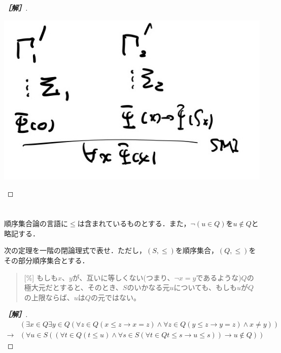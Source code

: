 \documentclass[uplatex,dvipdfmx]{jsarticle}
\begin{document}
\begin{proof}[\bf{［解］}]
\begin{center}
        \includegraphics[width=15cm]{figure3-9.jpg}
    \end{center}
\end{proof}

\section{}

\begin{notation*}
    順序集合論の言語に$\le$は含まれているものとする．また，$\lnot(u\in Q)$を$u\notin Q$と略記する．
\end{notation*}

\begin{problem}
    次の定理を一階の閉論理式で表せ．ただし，$(S,\le)$を順序集合，$(Q,\le)$をその部分順序集合とする．
    \begin{quote}
        [\%] もしも$x$、$y$が、互いに等しくない(つまり、$\lnot x=y$であるような)$Q$の極大元だとすると、そのとき、$S$のいかなる元$u$についても、もしも$u$が$Q$の上限ならば、$u$は$Q$の元ではない。
    \end{quote}
\end{problem}
\begin{proof}[\bf{［解］}]
    \begin{align*}
        &(\exists x\in Q \exists y\in Q (\forall z\in Q(x\le z\to x=z)\land \forall z\in Q(y\le z\to y=z)\land x\ne y))\\
        \to& (\forall u\in S((\forall t\in Q (t\le u)\land \forall s\in S(\forall t\in Q t\le s\to u\le s))\to u\notin Q))
    \end{align*}
\end{proof}
\end{document}
